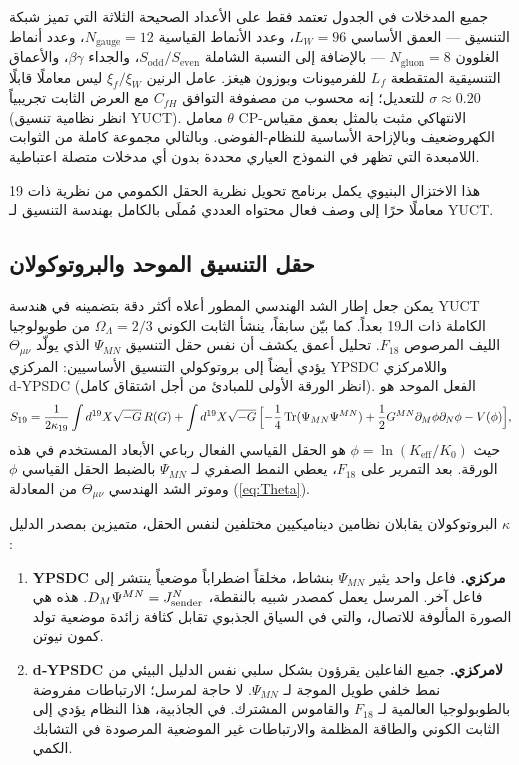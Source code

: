 \documentclass[12pt,a4paper]{article}
\DeclareMathOperator{\Tr}{Tr}
\begin{document}
	جميع المدخلات في الجدول تعتمد فقط على الأعداد الصحيحة الثلاثة التي تميز شبكة التنسيق — العمق الأساسي \(L_W=96\)، وعدد الأنماط القياسية \(N_{\mathrm{gauge}}=12\)، وعدد أنماط الغلوون \(N_{\mathrm{gluon}}=8\) — بالإضافة إلى النسبة الشاملة \(S_{\mathrm{odd}}/S_{\mathrm{even}}\)، والجداء \(\beta\gamma\)، والأعماق التنسيقية المتقطعة \(L_f\) للفرميونات وبوزون هيغز. عامل الرنين \(\xi_f/\xi_W\) ليس معاملًا قابلًا للتعديل؛ إنه محسوب من مصفوفة التوافق \(C_{fH}\) مع العرض الثابت تجريبياً \(\sigma \approx 0.20\) (انظر نظامية تنسيق YUCT). معامل \(\theta\) CP-الانتهاكي مثبت بالمثل بعمق مقياس الكهروضعيف وبالإزاحة الأساسية للنظام-الفوضى. وبالتالي مجموعة كاملة من الثوابت اللامبعدة التي تظهر في النموذج العياري محددة بدون أي مدخلات متصلة اعتباطية.
	
	هذا الاختزال البنيوي يكمل برنامج تحويل نظرية الحقل الكمومي من نظرية ذات 19 معاملًا حرًا إلى وصف فعال محتواه العددي مُملَى بالكامل بهندسة التنسيق لـ YUCT.
	
	\subsection{حقل التنسيق الموحد والبروتوكولان}
	\label{sec:unified-protocols}
	
	يمكن جعل إطار الشد الهندسي المطور أعلاه أكثر دقة بتضمينه في هندسة YUCT الكاملة ذات الـ19 بعداً. كما بيّن سابقاً، ينشأ الثابت الكوني \(\Omega_\Lambda=2/3\) من طوبولوجيا الليف المرصوص \(F_{18}\). تحليل أعمق يكشف أن نفس حقل التنسيق \(\Psi_{MN}\) الذي يولّد \(\Theta_{\mu\nu}\) يؤدي أيضاً إلى بروتوكولي التنسيق الأساسيين: المركزي YPSDC واللامركزي d‑YPSDC (انظر الورقة الأولى للمبادئ من أجل اشتقاق كامل). الفعل الموحد هو
	\begin{equation}
		S_{19} = \frac{1}{2\kappa_{19}} \int d^{19}X \sqrt{-G}\, R(G)
		+ \int d^{19}X \sqrt{-G}\,
		\Bigl[ -\frac14 \Tr(\Psi_{MN}\Psi^{MN})
		+ \frac12 G^{MN}\partial_M\phi \partial_N\phi
		- V(\phi) \Bigr],
		\label{eq:unified-gravity}
	\end{equation}
	حيث \(\phi = \ln(K_{\mathrm{eff}}/K_0)\) هو الحقل القياسي الفعال رباعي الأبعاد المستخدم في هذه الورقة. بعد التمرير على \(F_{18}\)، يعطي النمط الصفري لـ \(\Psi_{MN}\) بالضبط الحقل القياسي \(\phi\) وموتر الشد الهندسي \(\Theta_{\mu\nu}\) من المعادلة (\ref{eq:Theta}).
	
	البروتوكولان يقابلان نظامين ديناميكيين مختلفين لنفس الحقل، متميزين بمصدر الدليل \(\kappa\):
	\begin{enumerate}[leftmargin=*]
		\item \textbf{YPSDC مركزي.} فاعل واحد يثير \(\Psi_{MN}\) بنشاط، مخلقاً اضطراباً موضعياً ينتشر إلى فاعل آخر. المرسل يعمل كمصدر شبيه بالنقطة، \(D_M\Psi^{MN} = J^N_{\rm sender}\). هذه هي الصورة المألوفة للاتصال، والتي في السياق الجذبوي تقابل كثافة زائدة موضعية تولد كمون نيوتن.
		\item \textbf{d‑YPSDC لامركزي.} جميع الفاعلين يقرؤون بشكل سلبي نفس الدليل البيئي من نمط خلفي طويل الموجة لـ \(\Psi_{MN}\). لا حاجة لمرسل؛ الارتباطات مفروضة بالطوبولوجيا العالمية لـ \(F_{18}\) والقاموس المشترك. في الجاذبية، هذا النظام يؤدي إلى الثابت الكوني والطاقة المظلمة والارتباطات غير الموضعية المرصودة في التشابك الكمي.
	\end{enumerate}
	
\end{document}
